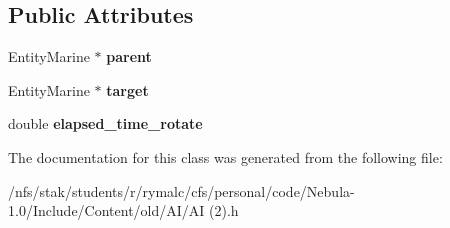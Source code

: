 \subsection*{Public Attributes}
\begin{DoxyCompactItemize}
\item 
\hypertarget{classAIEngine_1_1AI_aac5dd0a87dbe10153a7803df0a1f086e}{
EntityMarine $\ast$ {\bfseries parent}}
\label{classAIEngine_1_1AI_aac5dd0a87dbe10153a7803df0a1f086e}

\item 
\hypertarget{classAIEngine_1_1AI_a26ee1a9d90c6a876691059b95386c39f}{
EntityMarine $\ast$ {\bfseries target}}
\label{classAIEngine_1_1AI_a26ee1a9d90c6a876691059b95386c39f}

\item 
\hypertarget{classAIEngine_1_1AI_a3bb5b7b2e4fc3cdea6ccd4096706ab47}{
double {\bfseries elapsed\_\-time\_\-rotate}}
\label{classAIEngine_1_1AI_a3bb5b7b2e4fc3cdea6ccd4096706ab47}

\end{DoxyCompactItemize}


The documentation for this class was generated from the following file:\begin{DoxyCompactItemize}
\item 
/nfs/stak/students/r/rymalc/cfs/personal/code/Nebula-\/1.0/Include/Content/old/AI/AI (2).h\end{DoxyCompactItemize}
